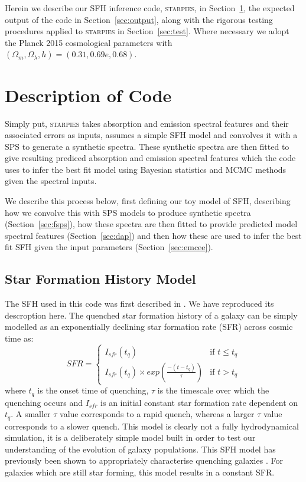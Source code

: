 \documentclass[useAMS,usenatbib]{mn2e}
\begin{document}
Herein we describe our SFH inference code, \textsc{starpies}, in Section~\ref{sec:code}, the expected output of the code in Section~\ref{sec:output}, along with the rigorous testing procedures applied to \textsc{starpies} in Section~\ref{sec:test}. Where necessary we adopt the Planck 2015 \citep{planck16} cosmological parameters with $(\Omega_m, \Omega_{\lambda}, h) = (0.31, 0.69e, 0.68)$. 

\section{Description of Code}\label{sec:code}

Simply put, \textsc{starpies} takes absorption and emission spectral features and their associated errors as inputs, assumes a simple SFH model and convolves it with a SPS to generate a synthetic spectra. These synthetic spectra are then fitted to give resulting prediced absorption and emission spectral features which the code uses to infer the best fit model using Bayesian statistics and MCMC methods given the spectral inputs. 

We describe this process below, first defining our toy model of SFH, describing how we convolve this with SPS models to produce synthetic spectra (Section~\ref{sec:fsps}), how these spectra are then fitted to provide predicted model spectral features (Section~\ref{sec:dap}) and then how these are used to infer the best fit SFH given the input parameters (Section~\ref{sec:emcee}). 

\subsection{Star Formation History Model}\label{sec:sfh}

The SFH used in this code was first described in \cite{smethurst15}. We have reproduced its descroption here. The quenched star formation history of a galaxy can be simply modelled as an exponentially declining star formation rate (SFR) across cosmic time as:
\begin{equation}\label{sfh}
SFR =
\begin{cases}
I_{sfr}(t_q) & \text{if } t \leq t_q \\
I_{sfr}(t_q) \times exp{\left( \frac{-(t-t_{q})}{\tau}\right)} & \text{if } t > t_q 
\end{cases}
\end{equation}
where $t_{q}$ is the onset time of quenching, $\tau$ is the timescale over which the quenching occurs and $I_{sfr}$ is an initial constant star formation rate dependent on $t_q$.  A smaller $\tau$ value corresponds to a rapid quench, whereas a larger $\tau$ value corresponds to a slower quench. This model is clearly not a fully hydrodynamical simulation, it is a deliberately simple model built in order to test our understanding of the evolution of galaxy populations. This SFH model has previously been shown to appropriately characterise quenching galaxies \citep{weiner06, martin07, noeske07,schawinski14}. For galaxies which are still star forming, this model results in a constant SFR.
\end{document}
